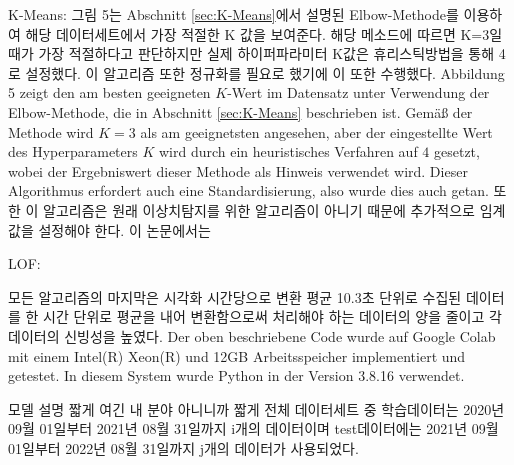         K-Means: 그림 5는 Abschnitt \ref{sec:K-Means}에서 설명된 Elbow-Methode를 이용하여 해당 데이터세트에서 가장 적절한 K 값을 보여준다. 해당 메소드에 따르면 K=3일때가 가장 적절하다고 판단하지만 실제 하이퍼파라미터 K값은 휴리스틱방법을 통해 4로 설정했다. 이 알고리즘 또한 정규화를 필요로 했기에 이 또한 수행했다.
        Abbildung 5 zeigt den am besten geeigneten $K$-Wert im Datensatz unter Verwendung der Elbow-Methode, die in Abschnitt \ref{sec:K-Means} beschrieben ist. Gemäß der Methode wird $K = 3$ als am geeignetsten angesehen, aber der eingestellte Wert des Hyperparameters $K$ wird durch ein heuristisches Verfahren auf $4$ gesetzt, wobei der Ergebniswert dieser Methode als Hinweis verwendet wird. Dieser Algorithmus erfordert auch eine Standardisierung, also wurde dies auch getan.
        또한 이 알고리즘은 원래 이상치탐지를 위한 알고리즘이 아니기 때문에 추가적으로 임계값을 설정해야 한다. 이 논문에서는 

        LOF: 




        모든 알고리즘의 마지막은 시각화
        시간당으로 변환
            평균 10.3초 단위로 수집된 데이터를 한 시간 단위로 평균을 내어 변환함으로써 처리해야 하는 데이터의 양을 줄이고 각 데이터의 신빙성을 높였다.
        Der oben beschriebene Code wurde auf Google Colab mit einem Intel(R) Xeon(R) und 12GB Arbeitsspeicher implementiert und getestet. In diesem System wurde Python in der Version 3.8.16 verwendet.

    모델 설명 짧게
        여긴 내 분야 아니니까 짧게
        전체 데이터세트 중 학습데이터는 2020년 09월 01일부터 2021년 08월 31일까지 i개의 데이터이며 test데이터에는 2021년 09월 01일부터 2022년 08월 31일까지 j개의 데이터가 사용되었다.
